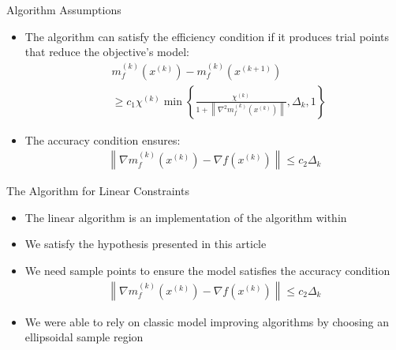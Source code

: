 \documentclass{beamer}
\newcommand{\xk}{{{x}^{(k)}}}
\begin{document}
\begin{frame}{Algorithm Assumptions}
	\begin{itemize}
		\item The algorithm can satisfy the efficiency condition if it produces trial points that reduce the objective's model:
		\begin{align*}
			& m_f^{(k)}\left(\xk\right) - m_f^{(k)}\left(x^{(k+1)}\right) \\
			& \ge c_1 \chi^{(k)} \min \left\{
				\frac{\chi^{(k)}}{1 + \left\|\nabla^2 m_f^{(k)}\left(x^{(k)}\right)\right\|},
				\Delta_k, 1\right\}
		\end{align*}
		\item The accuracy condition ensures:
		\begin{align*}
			\left\|\nabla m_f^{(k)}\left(x^{(k)}\right) - \nabla f\left(x^{(k)}\right)\right\| \le c_2 \Delta_k
		\end{align*}
	\end{itemize}
\end{frame}


\begin{frame}{The Algorithm for Linear Constraints}
	\begin{itemize}
		\item The linear algorithm is an implementation of the algorithm within \cite{CONEJO2013324}
		\item We satisfy the hypothesis presented in this article
		\item We need sample points to ensure the model satisfies the accuracy condition
\begin{align*}
		\left\|\nabla m_f^{(k)}\left(x^{(k)}\right) - \nabla f \left(x^{(k)}\right)\right\| \le c_2 \Delta_k
\end{align*}
		\item We were able to rely on classic model improving algorithms by choosing an ellipsoidal sample region
	\end{itemize}
\end{frame}
\end{document}
